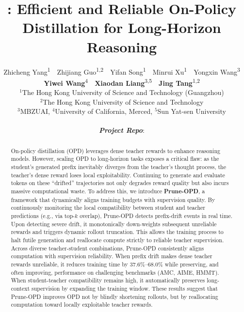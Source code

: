 \documentclass{article}
\title{\method: Efficient and Reliable On-Policy Distillation for Long-Horizon Reasoning}
\author{
Zhicheng Yang\textsuperscript{1}~~Zhijiang Guo\textsuperscript{1,2}~~Yifan Song\textsuperscript{1}~~Minrui Xu\textsuperscript{1}~~Yongxin Wang\textsuperscript{3}\\
\textbf{Yiwei Wang}\textsuperscript{4}~~\textbf{Xiaodan Liang}\textsuperscript{3,5}~~\textbf{Jing Tang}\textsuperscript{1,2}\\
$^1$The Hong Kong University of Science and Technology (Guangzhou) \\
$^2$The Hong Kong University of Science and Technology \\
$^3$MBZUAI, $^4$University of California, Merced, $^5$Sun Yat-sen University \\
\\
\textit{\textbf{Project Repo}}: \coloredhref[burgundy]{https://github.com/yangzhch6/Prune-OPD}{\ttfamily \textbf{https://github.com/yangzhch6/Prune-OPD}}
}
\begin{document}
\maketitle

\begin{abstract}
On-policy distillation (OPD) leverages dense teacher rewards to enhance reasoning models. However, scaling OPD to long-horizon tasks exposes a critical flaw: as the student's generated prefix inevitably diverges from the teacher's thought process, the teacher's dense reward loses local exploitability. Continuing to generate and evaluate tokens on these ``drifted'' trajectories not only degrades reward quality but also incurs massive computational waste. 
%
To address this, we introduce \textbf{Prune-OPD}, a framework that dynamically aligns training budgets with supervision quality. By continuously monitoring the local compatibility between student and teacher predictions (e.g., via top-$k$ overlap), Prune-OPD detects prefix-drift events in real time. Upon detecting severe drift, it monotonically down-weights subsequent unreliable rewards and triggers dynamic rollout truncation. This allows the training process to halt futile generation and reallocate compute strictly to reliable teacher supervision.
%
Across diverse teacher-student combinations, Prune-OPD consistently aligns computation with supervision reliability. When prefix drift makes dense teacher rewards unreliable, it reduces training time by 37.6\%--68.0\% while preserving, and often improving, performance on challenging benchmarks (AMC, AIME, HMMT). When student-teacher compatibility remains high, it automatically preserves long-context supervision by expanding the training window. These results suggest that Prune-OPD improves OPD not by blindly shortening rollouts, but by reallocating computation toward locally exploitable teacher rewards.

\end{abstract}
\vspace{-4mm}








% 


% 

\appendix

\end{document}
